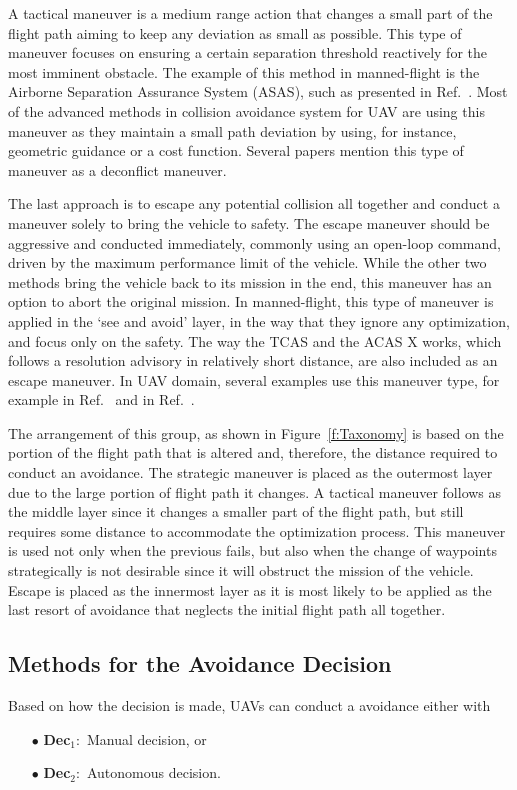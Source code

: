 A tactical maneuver is a medium range action that changes a small part of the flight path aiming to keep any deviation as small as possible. This type of maneuver focuses on ensuring a certain separation threshold reactively for the most imminent obstacle. The example of this method in manned-flight is the Airborne Separation Assurance System (ASAS), such as presented in Ref.~\cite{Ellerbroek:11}. Most of the advanced methods in collision avoidance system for UAV are using this maneuver as they maintain a small path deviation by using, for instance, geometric guidance\cite{Mujumdar:11} or a cost function\cite{Patel:11}. Several papers mention this type of maneuver as a deconflict maneuver\cite{barfield:00,Jenie:13a}.

The last approach is to escape any potential collision all together and conduct a maneuver solely to bring the vehicle to safety. The escape maneuver should be aggressive and conducted immediately, commonly using an open-loop command, driven by the maximum performance limit of the vehicle. While the other two methods bring the vehicle back to its mission in the end, this maneuver has an option to abort the original mission. In manned-flight, this type of maneuver is applied in the `see and avoid' layer, in the way that they ignore any optimization, and focus only on the safety. The way the TCAS and the ACAS X\cite{Kochenderfer:12} works, which follows a resolution advisory in relatively short distance, are also included as an escape maneuver. In UAV domain, several examples use this maneuver type, for example in Ref.~\cite{Bouabdallah:07} and in Ref.~\cite{Beyeler:09}.

The arrangement of this group, as shown in Figure~\ref{f:Taxonomy} is based on the portion of the flight path that is altered and, therefore, the distance required to conduct an avoidance. The strategic maneuver is placed as the outermost layer due to the large portion of flight path it changes. A tactical maneuver follows as the middle layer since it changes a smaller part of the flight path, but still requires some distance to accommodate the optimization process. This maneuver is used not only when the previous fails, but also when the change of waypoints strategically is not desirable since it will obstruct the mission of the vehicle. Escape is placed as the innermost layer as it is most likely to be applied as the last resort of avoidance that neglects the initial flight path all together.

\subsection{Methods for the Avoidance Decision}
Based on how the decision is made, UAVs can conduct a avoidance either with
\begin{itemize}[labelindent=\parindent,leftmargin=5pc]
	\item[$\bullet$ \textbf{Dec}$_1:$] Manual decision, or
	\item[$\bullet$ \textbf{Dec}$_2:$] Autonomous decision.
\end{itemize}

